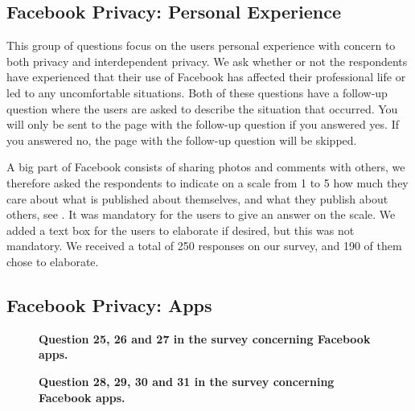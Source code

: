 \subsection{Facebook Privacy: Personal Experience}

This group of questions focus on the users personal experience with concern to both privacy and interdependent privacy. We ask whether or not the respondents have experienced that their use of Facebook has affected their professional life or led to any uncomfortable situations. Both of these questions have a follow-up question where the users are asked to describe the situation that occurred. You will only be sent to the page with the follow-up question if you answered yes. If you answered no, the page with the follow-up question will be skipped. 

A big part of Facebook consists of sharing photos and comments with others, we therefore asked the respondents to indicate on a scale from 1 to 5 how much they care about what is published about themselves, and what they publish about others, see . It was mandatory for the users to give an answer on the scale. We added a text box for the users to elaborate if desired, but this was not mandatory. We received a total of 250 responses on our survey, and 190 of them chose to elaborate. 

\subsection{Facebook Privacy: Apps}

\begin{figure}[t]
\centering
{}
\caption[Question 25, 26 and 27 in the survey concerning Facebook apps]{\textbf{Question 25, 26 and 27 in the survey concerning Facebook apps.}} 
\label{fig:page14}
\end{figure}

\begin{figure}[t]
\centering
{}
\caption[Question 28, 29, 30 and 31 in the survey concerning Facebook apps]{\textbf{Question 28, 29, 30 and 31 in the survey concerning Facebook apps.}} 
\label{fig:page15}
\end{figure}

